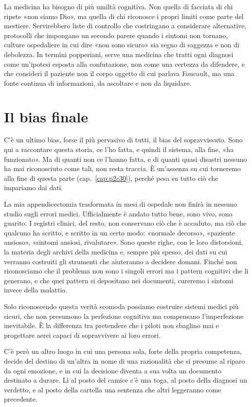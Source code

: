 La medicina ha bisogno di pi\`{u} umilt\`{a} cognitiva. Non quella di facciata di chi ripete «non siamo Dio», ma quella di chi riconosce i propri limiti come parte del mestiere. Servirebbero liste di controllo che costringano a considerare alternative, protocolli che impongano un secondo parere quando i sintomi non tornano, culture ospedaliere in cui dire «non sono sicuro» sia segno di saggezza e non di debolezza. In termini popperiani, serve una medicina che tratti ogni diagnosi come un'ipotesi esposta alla confutazione, non come una certezza da difendere, e che consideri il paziente non il corpo oggetto di cui parlava Foucault, ma una fonte continua di informazioni, da ascoltare e non da liquidare.

\section{Il bias finale}
\label{sec:p2c15-bias-finale}

C'\`{e} un ultimo bias, forse il pi\`{u} pervasivo di tutti, il bias del sopravvissuto. Sono qui a raccontare questa storia, ce l'ho fatta, e quindi il sistema, alla fine, «ha funzionato». Ma di quanti non ce l'hanno fatta, e di quanti quasi disastri nessuno ha mai riconosciuto come tali, non resta traccia. \`{E} un'assenza su cui torneremo alla fine di questa parte (cap.~\ref{cap:p2c30}), perch\'{e} pesa su tutto ci\`{o} che impariamo dai dati.

La mia appendicectomia trasformata in mesi di ospedale non finir\`{a} in nessuno studio sugli errori medici. Ufficialmente \`{e} andato tutto bene, sono vivo, sono guarito. I registri clinici, del resto, non conservano ci\`{o} che \`{e} accaduto, ma ci\`{o} che qualcuno ha scritto, e scritto in un certo modo: «normale decorso», «paziente ansioso», «sintomi ansiosi, rivalutare». Sono queste righe, con le loro distorsioni, la materia degli archivi della medicina e, sempre pi\`{u} spesso, dei dati su cui verranno costruiti gli strumenti che aiuteranno a decidere domani. Finch\'{e} non riconosciamo che il problema non sono i singoli errori ma i pattern cognitivi che li generano, e che quei pattern si depositano nei documenti, cureremo i sintomi invece della malattia.

Solo riconoscendo questa verit\`{a} scomoda possiamo costruire sistemi medici pi\`{u} sicuri, che non presumono la perfezione cognitiva ma compensano l'imperfezione inevitabile. \`{E} la differenza tra pretendere che i piloti non sbaglino mai e progettare aerei capaci di sopravvivere ai loro errori.

C'\`{e} per\`{o} un altro luogo in cui una persona sola, forte della propria competenza, decide del destino di un'altra in nome di una razionalit\`{a} che si presume al riparo da ogni emozione, e in cui la decisione diventa a sua volta un documento destinato a durare. L\`{i} al posto del camice c'\`{e} una toga, al posto della diagnosi un verdetto, e al posto della cartella una sentenza che altri leggeranno come precedente.
